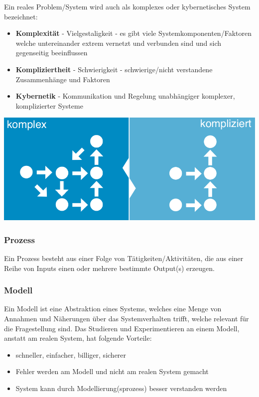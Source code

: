 Ein reales Problem/System wird auch als komplexes oder kybernetisches System bezeichnet:
\begin{itemize}
    \item \textbf{Komplexität} - Vielgestaligkeit - es gibt viele Systemkomponenten/Faktoren welche untereinander extrem vernetzt und verbunden sind und sich gegenseitig beeinflussen
 
    \item \textbf{Kompliziertheit} - Schwierigkeit -  schwierige/nicht verstandene Zusammenhänge und Faktoren
\item \textbf{Kybernetik} - Kommunikation und Regelung unabhängiger komplexer, komplizierter Systeme
\end{itemize}
   \begin{minipage}[t]{1\textwidth}
    \centering
	\includegraphics[width=0.6\linewidth]{images/komplex-kompliziert.png}
    \end{minipage}
\subsubsection{Prozess}
Ein Prozess besteht aus einer Folge von Tätigkeiten/Aktivitäten, die aus einer Reihe von Inputs einen oder mehrere bestimmte Output(s) erzeugen.
\subsubsection{Modell}
Ein Modell ist eine Abstraktion eines Systems, welches eine Menge von Annahmen und Näherungen über das Systemverhalten trifft, welche relevant für die Fragestellung sind.
Das Studieren und Experimentieren an einem Modell, anstatt am realen System, hat folgende Vorteile:
\begin{itemize}
    \item schneller, einfacher, billiger, sicherer
    \item Fehler werden am Modell und nicht am realen System gemacht
    \item System kann durch Modellierung(sprozess) besser verstanden werden
\end{itemize}
